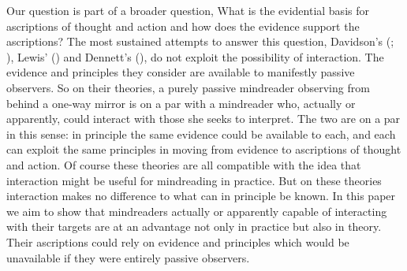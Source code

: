 \documentclass[12pt,a4paper]{extarticle}
\begin{document}
Our question is part of a broader question,
What is the evidential basis for ascriptions of thought and action and how does the evidence support the ascriptions?
The most sustained attempts to answer this question,
Davidson's (\citeyear{Davidson:1984wh}; \citeyear{Davidson:1990du}), Lewis' (\citeyear{lewis:1974ri}) and Dennett's (\citeyear{Dennett:1987sf}),
do not exploit the possibility of interaction.
The evidence and principles they consider are available to manifestly passive observers.
So on their theories,
a purely passive mindreader observing from behind a one-way mirror
is on a par with
a mindreader who, actually or apparently, could interact with those she seeks to interpret.
The two are on a par in this sense:
in principle the same evidence could be available to each, and each can exploit the same principles in moving from evidence to ascriptions of thought and action.
Of course these theories are all compatible with the idea that interaction might be useful for mindreading in practice.  
But on these theories interaction makes no difference to what can in principle be known.
In this paper we aim to show
that mindreaders actually or apparently capable of interacting with their targets are at an advantage not only in practice but also in theory.
Their ascriptions could rely on evidence and principles which would be unavailable if they were entirely passive observers.
\end{document}
